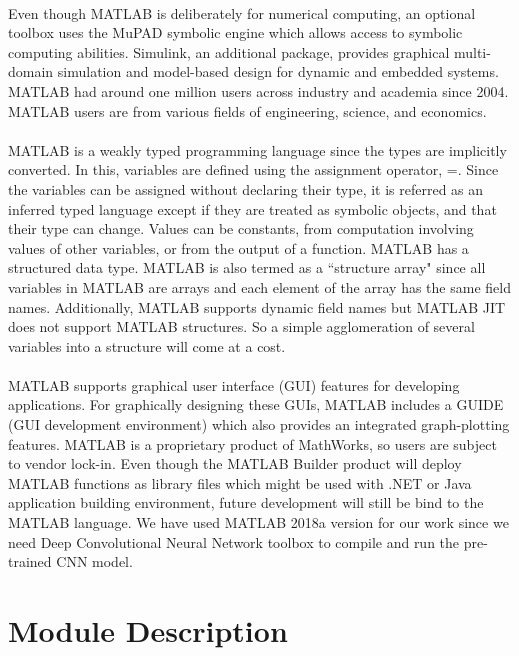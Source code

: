 \paragraph{} Even though MATLAB is deliberately for numerical computing, an optional toolbox uses the MuPAD symbolic engine which allows access to symbolic computing abilities. Simulink, an additional package, provides graphical multi-domain simulation and model-based design for dynamic and embedded systems. MATLAB had around one million users across industry and academia since 2004. MATLAB users are from various fields of engineering, science, and economics.

\paragraph{} MATLAB is a weakly typed programming language since the types are implicitly converted. In this, variables are defined using the assignment operator, =. Since the variables can be assigned without declaring their type, it is referred as an inferred typed language except if they are treated as symbolic objects, and that their type can change. Values can be constants, from computation involving values of other variables, or from the output of a function. MATLAB has a structured data type. MATLAB is also termed as a ``structure array" since all variables in MATLAB are arrays and each element of the array has the same field names. Additionally, MATLAB supports dynamic field names but MATLAB JIT does not support MATLAB structures. So a simple agglomeration of several variables into a structure will come at a cost. 

\paragraph{}MATLAB supports graphical user interface (GUI) features for developing applications. For graphically designing these GUIs, MATLAB includes a GUIDE (GUI development environment) which also provides an integrated graph-plotting features. MATLAB is a proprietary product of MathWorks, so users are subject to vendor lock-in. Even though the MATLAB Builder product will deploy MATLAB functions as library files which might be used with .NET or Java application building environment, future development will still be bind to the MATLAB language. We have used MATLAB 2018a version for our work since we need Deep Convolutional Neural Network toolbox to compile and run the pre-trained CNN model.
\section{Module Description}

